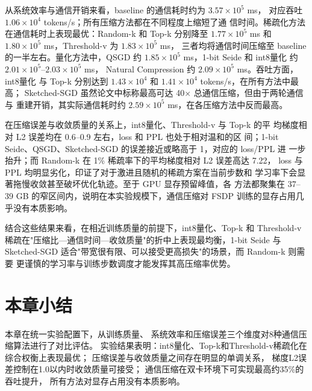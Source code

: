 从系统效率与通信开销来看，baseline 的通信耗时约为 $3.57 \times 10^5$ ms，
对应吞吐 $1.06 \times 10^4$ tokens/s；所有压缩方法都在不同程度上缩短了通
信时间。稀疏化方法在通信耗时上表现最优：Random-k 和 Top-k 分别降至
$1.77 \times 10^5$ ms 和 $1.80 \times 10^5$ ms，Threshold-v 为 $1.83 \times 10^5$ ms，
三者均将通信时间压缩至 baseline 的一半左右。量化方法中，QSGD 约
$1.85 \times 10^5$ ms，1-bit Seide 和 int8量化 约 $2.01 \times 10^5$--$2.03 \times 10^5$ ms，
Natural Compression 约 $2.09 \times 10^5$ ms。吞吐方面，int8量化 与 Top-k
分别达到 $1.43 \times 10^4$ 和 $1.41 \times 10^4$ tokens/s，在所有方法中最高；
Sketched-SGD 虽然论文中标称最高可达 40$\times$ 总通信压缩，但由于两轮通信与
重建开销，其实际通信耗时约 $2.59 \times 10^5$ ms，在各压缩方法中反而最高。

在压缩误差与收敛质量的关系上，int8量化、Threshold-v 与 Top-k 的平
均梯度相对 L2 误差均在 0.6--0.9 左右，loss 和 PPL 也处于相对温和的区
间；1-bit Seide、QSGD、Sketched-SGD 的误差接近或略高于 1，对应的 loss/PPL 进
一步抬升；而 Random-k 在 1\% 稀疏率下的平均梯度相对 L2 误差高达 7.22，
loss 与 PPL 均明显劣化，印证了对于激进且随机的稀疏方案在当前步数和
学习率下会显著拖慢收敛甚至破坏优化轨迹。至于 GPU 显存预留峰值，各
方法都聚集在 37--39 GB 的窄区间内，说明在本实验规模下，通信压缩对
FSDP 训练的显存占用几乎没有本质影响。

结合这些结果来看，在相近训练质量的前提下，int8量化、Top-k 和 Threshold-v
稀疏在"压缩比—通信时间—收敛质量"的折中上表现最均衡，1-bit Seide 与
Sketched-SGD 适合"带宽很有限、可以接受更高损失"的场景，而 Random-k 则需要
更谨慎的学习率与训练步数调度才能发挥其高压缩率优势。

\section{本章小结}

本章在统一实验配置下，从训练质量、
系统效率和压缩误差三个维度对8种通信压缩算法进行了对比评估。
实验结果表明：int8量化、Top-k和Threshold-v稀疏化在综合权衡上表现最优；
压缩误差与收敛质量之间存在明显的单调关系，
梯度L2误差控制在1.0以内时收敛质量可接受；
通信压缩在双卡环境下可实现最高约35\%的吞吐提升，
所有方法对显存占用没有本质影响。
